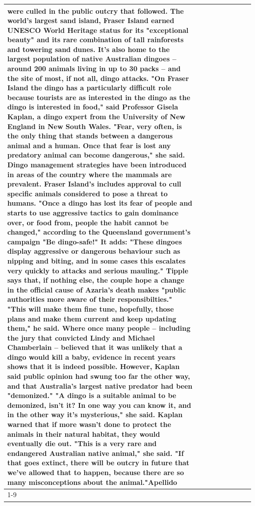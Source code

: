 \begin{table}[H]
\begin{tabular}{lllrlllll}
were culled in the public outcry that followed. The world's largest sand island, Fraser Island earned UNESCO World Heritage status for its "exceptional beauty" and its rare combination of tall rainforests and towering sand dunes. It's also home to the largest population of native Australian dingoes -- around 200 animals living in up to 30 packs -- and the site of most, if not all, dingo attacks. "On Fraser Island the dingo has a particularly difficult role because tourists are as interested in the dingo as the dingo is interested in food," said Professor Gisela Kaplan, a dingo expert from the University of New England in New South Wales. "Fear, very often, is the only thing that stands between a dangerous animal and a human. Once that fear is lost any predatory animal can become dangerous," she said. Dingo management strategies have been introduced in areas of the country where the mammals are prevalent. Fraser Island's includes approval to cull specific animals considered to pose a threat to humans. "Once a dingo has lost its fear of people and starts to use aggressive tactics to gain dominance over, or food from, people the habit cannot be changed," according to the Queensland government's campaign "Be dingo-safe!" It adds: "These dingoes display aggressive or dangerous behaviour such as nipping and biting, and in some cases this escalates very quickly to attacks and serious mauling." Tipple says that, if nothing else, the couple hope a change in the official cause of Azaria's death makes "public authorities more aware of their responsibilties." "This will make them fine tune, hopefully, those plans and make them current and keep updating them," he said. Where once many people -- including the jury that convicted Lindy and Michael Chamberlain -- believed that it was unlikely that a dingo would kill a baby, evidence in recent years shows that it is indeed possible. However, Kaplan said public opinion had swung too far the other way, and that Australia's largest native predator had been "demonized." "A dingo is a suitable animal to be demonized, isn't it? In one way you can know it, and in the other way it's mysterious," she said. Kaplan warned that if more wasn't done to protect the animals in their natural habitat, they would eventually die out. "This is a very rare and endangered Australian native animal," she said. "If that goes extinct, there will be outcry in future that we've allowed that to happen, because there are so many misconceptions about the animal."Apellido \\
\cline{1-9}
\bottomrule
\end{tabular}
\end{table}
